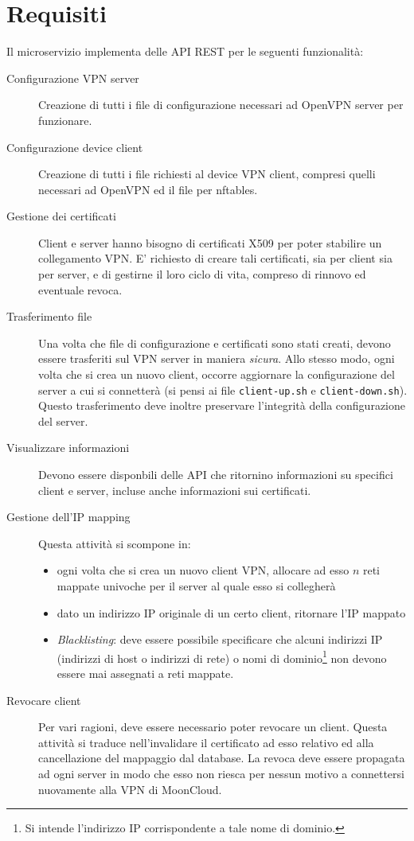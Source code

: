 \section{Requisiti}
Il microservizio implementa delle API REST per le seguenti funzionalità:
\begin{description}
  \item[Configurazione VPN server]Creazione di tutti i file di configurazione
  necessari ad OpenVPN server per funzionare.
  \item[Configurazione device client]Creazione di tutti i file richiesti al
  device VPN client, compresi quelli necessari ad OpenVPN ed il file per nftables.
  \item[Gestione dei certificati]Client e server hanno bisogno di certificati
  X509 per poter stabilire un collegamento VPN. E' richiesto di creare tali
  certificati, sia per client sia per server, e di gestirne il loro ciclo di vita,
  compreso di rinnovo ed eventuale revoca.
  \item[Trasferimento file]Una volta che file di configurazione e certificati
  sono stati creati, devono essere trasferiti sul VPN server in maniera \textit{sicura}.
  Allo stesso modo, ogni volta che si crea un nuovo client, occorre aggiornare
  la configurazione del server a cui si connetterà (si pensi ai file \texttt{client-up.sh}
  e \texttt{client-down.sh}). Questo trasferimento deve inoltre preservare l'integrità
  della configurazione del server.
  \item[Visualizzare informazioni]Devono essere disponbili delle API che ritornino informazioni
  su specifici client e server, incluse anche informazioni sui certificati.
  \item[Gestione dell'IP mapping]Questa attività si scompone in:
  \begin{itemize}
    \item ogni volta che si crea un nuovo client VPN, allocare ad esso $n$ reti mappate
    univoche per il server al quale esso si collegherà
    \item dato un indirizzo IP originale di un certo client, ritornare l'IP mappato
    \item \textit{Blacklisting}: deve essere possibile specificare che alcuni indirizzi
    IP (indirizzi di host o indirizzi di rete) o nomi di dominio\footnote{Si intende
    l'indirizzo IP corrispondente a tale nome di dominio.} non devono essere mai assegnati
    a reti mappate.
  \end{itemize}
  \item[Revocare client]Per vari ragioni, deve essere necessario poter revocare un
  client. Questa attività si traduce nell'invalidare il certificato ad esso relativo
  ed alla cancellazione del mappaggio dal database.
  La revoca deve essere propagata ad ogni server in modo che esso non riesca per nessun
  motivo a connettersi nuovamente alla VPN di MoonCloud.
\end{description}


